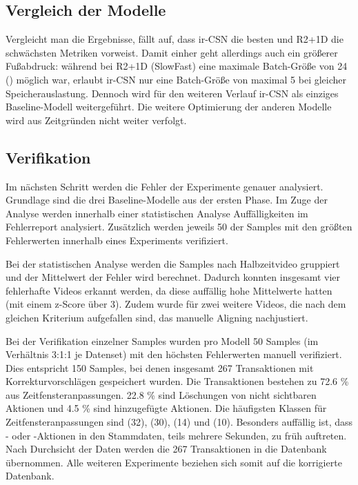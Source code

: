 \subsection{Vergleich der Modelle}
\label{subsec:vergleich-der-modelle}

Vergleicht man die Ergebnisse, fällt auf, dass ir-CSN die besten und R2+1D die schwächsten Metriken vorweist.
Damit einher geht allerdings auch ein größerer Fußabdruck:
während bei R2+1D (\bzw SlowFast) eine maximale Batch-Größe von 24 () möglich war, erlaubt ir-CSN nur eine Batch-Größe von maximal 5 bei gleicher Speicherauslastung.
Dennoch wird für den weiteren Verlauf ir-CSN als einziges Baseline-Modell weitergeführt.
Die weitere Optimierung der anderen Modelle wird aus Zeitgründen nicht weiter verfolgt.

\subsection{Verifikation}
\label{sec:verifikation}

Im nächsten Schritt werden die Fehler der Experimente genauer analysiert.
Grundlage sind die drei Baseline-Modelle aus der ersten Phase.
Im Zuge der Analyse werden innerhalb einer statistischen Analyse Auffälligkeiten im Fehlerreport analysiert.
Zusätzlich werden jeweils 50 der Samples mit den größten Fehlerwerten innerhalb eines Experiments verifiziert.

Bei der statistischen Analyse werden die Samples nach Halbzeitvideo gruppiert und der Mittelwert der Fehler wird berechnet.
Dadurch konnten insgesamt vier fehlerhafte Videos erkannt werden, da diese auffällig hohe Mittelwerte hatten (mit einem z-Score über 3).
Zudem wurde für zwei weitere Videos, die nach dem gleichen Kriterium aufgefallen sind, das manuelle Aligning nachjustiert.

Bei der Verifikation einzelner Samples wurden pro Modell 50 Samples (im Verhältnis 3:1:1 je Datenset) mit den höchsten Fehlerwerten manuell verifiziert.
Dies entspricht 150 Samples, bei denen insgesamt 267 Transaktionen mit Korrekturvorschlägen gespeichert wurden.
Die Transaktionen bestehen zu 72.6 \% aus Zeitfensteranpassungen.
22.8 \% sind Löschungen von nicht sichtbaren Aktionen und 4.5 \% sind hinzugefügte Aktionen.
Die häufigsten Klassen für Zeitfensteranpassungen sind  (32),  (30),  (14) und  (10).
Besonders auffällig ist, dass \zB {}- oder -Aktionen in den Stammdaten, teils mehrere Sekunden, zu früh auftreten.
Nach Durchsicht der Daten werden die 267 Transaktionen in die Datenbank übernommen.
Alle weiteren Experimente beziehen sich somit auf die korrigierte Datenbank.

